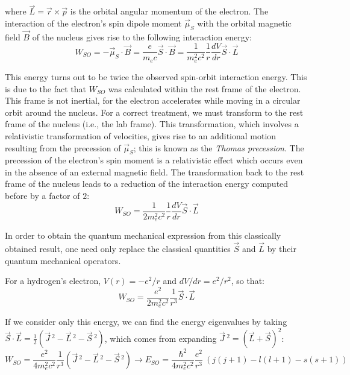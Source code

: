 where $\vec{L} = \vec{r}\times \vec{p}$ is the orbital angular momentum of the electron. The interaction of the electron's spin dipole moment $\vec{\mu}_S$ with the orbital magnetic field $\vec{B}$ of the nucleus gives rise to the following interaction energy:
\begin{equation}
    W_{SO} = -\vec{\mu}_S \cdot \vec{B} = \frac{e}{m_ec}\vec{S}\cdot \vec{B} = \frac{1}{m_e^2c^2}\frac{1}{r} \frac{dV}{dr}\vec{S}\cdot \vec{L}
\end{equation}

This energy turns out to be twice the observed spin-orbit interaction energy. This is due to the fact that $W_{SO}$ was calculated within the rest frame of the electron. This frame is not inertial, for the electron accelerates while moving in a circular orbit around the nucleus. For a correct treatment, we must transform to the rest frame of the nucleus (i.e., the lab frame). This transformation, which involves a relativistic transformation of velocities, gives rise to an additional motion resulting from the precession of $\vec{\mu}_S$; this is known as the \textit{Thomas precession}. The precession of the electron's spin moment is a relativistic effect which occurs even in the absence of an external magnetic field. The transformation back to the rest frame of the nucleus leads to a reduction of the interaction energy computed before by a factor of $2$:
\begin{equation}
    W_{SO} = \frac{1}{2m_e^2c^2}\frac{1}{r} \frac{dV}{dr}\vec{S}\cdot \vec{L}
\end{equation}

In order to obtain the quantum mechanical expression from this classically obtained result, one need only replace the classical quantities $\vec{S}$ and $\vec{L}$ by their quantum mechanical operators.

For a hydrogen's electron, $V(r)=-e^2/r$ and $dV/dr=e^2/r^2$, so that:
\begin{equation}
    W_{SO} = \frac{e^2}{2m_e^2c^2}\frac{1}{r^3}\vec{S}\cdot \vec{L}
\end{equation}

If we consider only this energy, we can find the energy eigenvalues by taking $\vec{S}\cdot \vec{L} = \frac{1}{2}(\vec{J}\,^2 - \vec{L}\,^2 - \vec{S}\,^2)$, which comes from expanding $\vec{J}\,^2 = (\vec{L}+\vec{S})^2$:
\begin{equation}
    W_{SO} = \frac{e^2}{4m_e^2c^2}\frac{1}{r^3}(\vec{J}\,^2 - \vec{L}\,^2 - \vec{S}\,^2) \longrightarrow E_{SO} = \frac{\hbar^2}{4m_e^2c^2}\frac{e^2}{r^3}\ (j(j+1)-l(l+1)-s(s+1))
\end{equation}

